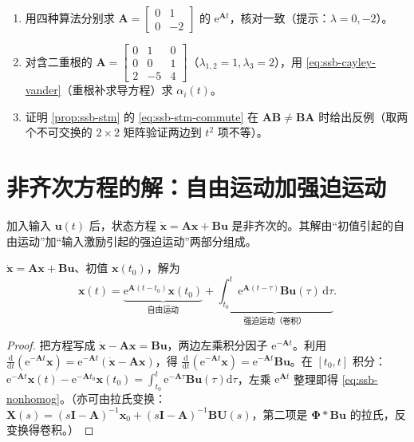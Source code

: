 \begin{practice}
\begin{enumerate}
  \item 用四种算法分别求 $\mathbf{A}=\begin{bmatrix}0&1\\0&-2\end{bmatrix}$ 的 $\mathrm{e}^{\mathbf{A}t}$，核对一致（提示：$\lambda=0,-2$）。
  \item 对含二重根的 $\mathbf{A}=\begin{bmatrix}0&1&0\\0&0&1\\2&-5&4\end{bmatrix}$（$\lambda_{1,2}=1,\lambda_3=2$），用 \cref{eq:ssb-cayley-vander}（重根补求导方程）求 $\alpha_i(t)$。
  \item 证明 \cref{prop:ssb-stm} 的 \cref{eq:ssb-stm-commute} 在 $\mathbf{A}\mathbf{B}\neq\mathbf{B}\mathbf{A}$ 时给出反例（取两个不可交换的 $2\times2$ 矩阵验证两边到 $t^2$ 项不等）。
\end{enumerate}
\end{practice}

\section{非齐次方程的解：自由运动加强迫运动}
\label{sec:ssb-nonhomog}

加入输入 $\mathbf{u}(t)$ 后，状态方程 $\dot{\mathbf{x}}=\mathbf{A}\mathbf{x}+\mathbf{B}\mathbf{u}$ 是非齐次的。其解由“初值引起的自由运动”加“输入激励引起的强迫运动”两部分组成。

\begin{theorem}[线性定常非齐次方程的解]\label{thm:ssb-nonhomog}
$\dot{\mathbf{x}}=\mathbf{A}\mathbf{x}+\mathbf{B}\mathbf{u}$、初值 $\mathbf{x}(t_0)$，解为
\begin{equation}
  \mathbf{x}(t)=\underbrace{\mathrm{e}^{\mathbf{A}(t-t_0)}\mathbf{x}(t_0)}_{\text{自由运动}}+\underbrace{\int_{t_0}^{t}\mathrm{e}^{\mathbf{A}(t-\tau)}\mathbf{B}\mathbf{u}(\tau)\,\mathrm{d}\tau}_{\text{强迫运动（卷积）}}.
  \label{eq:ssb-nonhomog}
\end{equation}
\end{theorem}
\begin{proof}
把方程写成 $\dot{\mathbf{x}}-\mathbf{A}\mathbf{x}=\mathbf{B}\mathbf{u}$，两边左乘积分因子 $\mathrm{e}^{-\mathbf{A}t}$。利用 $\tfrac{\mathrm{d}}{\mathrm{d}t}(\mathrm{e}^{-\mathbf{A}t}\mathbf{x})=\mathrm{e}^{-\mathbf{A}t}(\dot{\mathbf{x}}-\mathbf{A}\mathbf{x})$，得 $\tfrac{\mathrm{d}}{\mathrm{d}t}(\mathrm{e}^{-\mathbf{A}t}\mathbf{x})=\mathrm{e}^{-\mathbf{A}t}\mathbf{B}\mathbf{u}$。在 $[t_0,t]$ 积分：$\mathrm{e}^{-\mathbf{A}t}\mathbf{x}(t)-\mathrm{e}^{-\mathbf{A}t_0}\mathbf{x}(t_0)=\int_{t_0}^t\mathrm{e}^{-\mathbf{A}\tau}\mathbf{B}\mathbf{u}(\tau)\mathrm{d}\tau$，左乘 $\mathrm{e}^{\mathbf{A}t}$ 整理即得 \cref{eq:ssb-nonhomog}。（亦可由拉氏变换：$\mathbf{X}(s)=(s\mathbf{I}-\mathbf{A})^{-1}\mathbf{x}_0+(s\mathbf{I}-\mathbf{A})^{-1}\mathbf{B}\mathbf{U}(s)$，第二项是 $\boldsymbol{\Phi}\ast\mathbf{B}\mathbf{u}$ 的拉氏，反变换得卷积。）
\end{proof}

